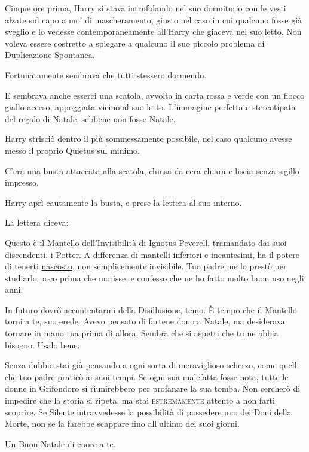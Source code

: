 Cinque ore prima, Harry si stava intrufolando nel suo dormitorio con le vesti alzate sul capo a mo’ di mascheramento, giusto nel caso in cui qualcuno fosse già sveglio e lo vedesse contemporaneamente all’Harry che giaceva nel suo letto. Non voleva essere costretto a spiegare a qualcuno il suo piccolo problema di Duplicazione Spontanea.

Fortunatamente sembrava che tutti stessero dormendo.

E sembrava anche esserci una scatola, avvolta in carta rossa e verde con un fiocco giallo acceso, appoggiata vicino al suo letto. L’immagine perfetta e stereotipata del regalo di Natale, sebbene non fosse Natale.

Harry strisciò dentro il più sommessamente possibile, nel caso qualcuno avesse messo il proprio Quietus sul minimo.

C’era una busta attaccata alla scatola, chiusa da cera chiara e liscia senza sigillo impresso.

Harry aprì cautamente la busta, e prese la lettera al suo interno.

La lettera diceva:

\vspace{1em}
\begin{addmargin}[3em]{3em}%
\begin{itpars}

Questo è il Mantello dell’Invisibilità di Ignotus Peverell, tramandato dai suoi discendenti, i Potter. A differenza di mantelli inferiori e incantesimi, ha il potere di tenerti \underline{nascosto}, non semplicemente invisibile. Tuo padre me lo prestò per studiarlo poco prima che morisse, e confesso che ne ho fatto molto buon uso negli anni.

In futuro dovrò accontentarmi della Disillusione, temo. È tempo che il Mantello torni a te, suo erede. Avevo pensato di fartene dono a Natale, ma desiderava tornare in mano tua prima di allora. Sembra che si aspetti che tu ne abbia bisogno. Usalo bene.

Senza dubbio stai già pensando a ogni sorta di meraviglioso scherzo, come quelli che tuo padre praticò ai suoi tempi. Se ogni sua malefatta fosse nota, tutte le donne in Grifondoro si riunirebbero per profanare la sua tomba. Non cercherò di impedire che la storia si ripeta, ma stai \textsc{estremamente} attento a non farti scoprire. Se Silente intravvedesse la possibilità di possedere uno dei Doni della Morte, non se la farebbe scappare fino all’ultimo dei suoi giorni.

Un Buon Natale di cuore a te.
\end{itpars}
\end{addmargin}
\vspace{1em}

